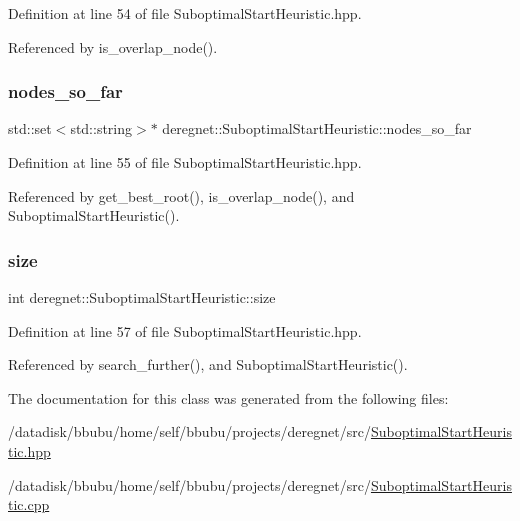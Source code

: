 Definition at line 54 of file Suboptimal\+Start\+Heuristic.\+hpp.



Referenced by is\+\_\+overlap\+\_\+node().

\mbox{\label{classderegnet_1_1SuboptimalStartHeuristic_af9a38b598d55b9a1fa22b9f0c141218b}} 
\subsubsection{\texorpdfstring{nodes\+\_\+so\+\_\+far}{nodes\_so\_far}}
{\footnotesize\ttfamily std\+::set$<$std\+::string$>$$\ast$ deregnet\+::\+Suboptimal\+Start\+Heuristic\+::nodes\+\_\+so\+\_\+far\hspace{0.3cm}{\ttfamily [private]}}



Definition at line 55 of file Suboptimal\+Start\+Heuristic.\+hpp.



Referenced by get\+\_\+best\+\_\+root(), is\+\_\+overlap\+\_\+node(), and Suboptimal\+Start\+Heuristic().

\mbox{\label{classderegnet_1_1SuboptimalStartHeuristic_a8645bf64e5cd06e7c432eb7b38f3d80a}} 
\subsubsection{\texorpdfstring{size}{size}}
{\footnotesize\ttfamily int deregnet\+::\+Suboptimal\+Start\+Heuristic\+::size\hspace{0.3cm}{\ttfamily [private]}}



Definition at line 57 of file Suboptimal\+Start\+Heuristic.\+hpp.



Referenced by search\+\_\+further(), and Suboptimal\+Start\+Heuristic().



The documentation for this class was generated from the following files\+:\begin{DoxyCompactItemize}
\item 
/datadisk/bbubu/home/self/bbubu/projects/deregnet/src/\hyperlink{SuboptimalStartHeuristic_8hpp}{Suboptimal\+Start\+Heuristic.\+hpp}\item 
/datadisk/bbubu/home/self/bbubu/projects/deregnet/src/\hyperlink{SuboptimalStartHeuristic_8cpp}{Suboptimal\+Start\+Heuristic.\+cpp}\end{DoxyCompactItemize}
